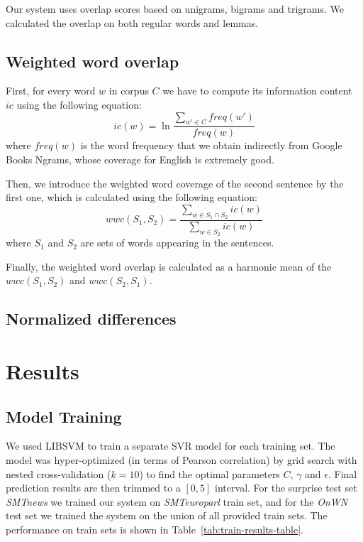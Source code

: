 \documentclass[10pt, a4paper]{article}
\begin{document}
Our system uses overlap scores based on unigrams, bigrams and trigrams. We calculated the overlap on both regular words and lemmas.

\subsection{Weighted word overlap}

First, for every word $w$ in corpus $C$ we have to compute its information content $ic$ using the following equation:
\begin{equation}
	ic(w) = \ln \frac{\sum_{w' \in C} freq(w')}{freq(w)}
\end{equation}
where $freq(w)$ is the word frequency that we obtain indirectly from Google Books Ngrams, whose coverage for English is extremely good. \citep{michel2011quantitative}

Then, we introduce the weighted word coverage of the second sentence by the first one, which is calculated using the following equation:
\begin{equation}
	wwc(S_1, S_2) = \frac{\sum_{w \in S_1 \cap S_2} ic(w)}{\sum_{w \in S_2} ic(w)}
\end{equation}
where $S_1$ and $S_2$ are sets of words appearing in the sentences.

Finally, the weighted word overlap is calculated as a harmonic mean of the $wwc(S_1,S_2)$ and $wwc(S_2,S_1)$.

\subsection{Normalized differences}



\section{Results}

\subsection{Model Training}

We used LIBSVM \citep{chang2011libsvm} to train a separate SVR model for each training set. The model was hyper-optimized (in terms of Pearson correlation) by grid search with nested cross-validation ($k=10$) to find the optimal parameters $C$, $\gamma$ and $\epsilon$. Final prediction results are then trimmed to a $[0,5]$ interval. For the surprise test set \textit{SMTnews} we trained our system on \textit{SMTeuroparl} train set, and for the \textit{OnWN} test set we trained the system on the union of all provided train sets. The performance on train sets is shown in Table~\ref{tab:train-results-table}.
\end{document}
